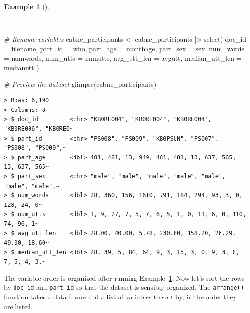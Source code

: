 \documentclass[
  letterpaper,
  DIV=11,
  numbers=noendperiod]{scrreprt}
\newenvironment{Shaded}{\begin{snugshade}}{\end{snugshade}}
\newcommand{\AttributeTok}[1]{\textcolor[rgb]{0.00,0.00,0.00}{#1}}
\newcommand{\CommentTok}[1]{\textcolor[rgb]{0.00,0.00,0.00}{\textit{#1}}}
\newcommand{\FunctionTok}[1]{\textcolor[rgb]{0.00,0.00,0.00}{#1}}
\newcommand{\NormalTok}[1]{\textcolor[rgb]{0.00,0.00,0.00}{#1}}
\newcommand{\OtherTok}[1]{\textcolor[rgb]{0.00,0.00,0.00}{#1}}
\newcommand{\SpecialCharTok}[1]{\textcolor[rgb]{0.00,0.00,0.00}{#1}}
\theoremstyle{definition}
\newtheorem{example}{Example}[chapter]
\theoremstyle{remark}
\begin{document}
\begin{example}[]\protect\hypertarget{exm-cd-cabnc-rename-vars}{}\label{exm-cd-cabnc-rename-vars}

~

\begin{Shaded}
\begin{Highlighting}[]
\CommentTok{\# Rename variables}
\NormalTok{cabnc\_participants }\OtherTok{\textless{}{-}}
\NormalTok{  cabnc\_participants }\SpecialCharTok{|\textgreater{}}
  \FunctionTok{select}\NormalTok{(}
    \AttributeTok{doc\_id =}\NormalTok{ filename,}
    \AttributeTok{part\_id =}\NormalTok{ who,}
    \AttributeTok{part\_age =}\NormalTok{ monthage,}
    \AttributeTok{part\_sex =}\NormalTok{ sex,}
    \AttributeTok{num\_words =}\NormalTok{ numwords,}
    \AttributeTok{num\_utts =}\NormalTok{ numutts,}
    \AttributeTok{avg\_utt\_len =}\NormalTok{ avgutt,}
    \AttributeTok{median\_utt\_len =}\NormalTok{ medianutt}
\NormalTok{  )}

\CommentTok{\# Preview the dataset}
\FunctionTok{glimpse}\NormalTok{(cabnc\_participants)}
\end{Highlighting}
\end{Shaded}

\begin{verbatim}
> Rows: 6,190
> Columns: 8
> $ doc_id         <chr> "KB0RE004", "KB0RE004", "KB0RE004", "KB0RE006", "KB0RE0~
> $ part_id        <chr> "PS008", "PS009", "KB0PSUN", "PS007", "PS008", "PS009",~
> $ part_age       <dbl> 481, 481, 13, 949, 481, 481, 13, 637, 565, 13, 637, 565~
> $ part_sex       <chr> "male", "male", "male", "male", "male", "male", "male",~
> $ num_words      <dbl> 28, 360, 156, 1610, 791, 184, 294, 93, 3, 0, 128, 24, 0~
> $ num_utts       <dbl> 1, 9, 27, 7, 5, 7, 6, 5, 1, 0, 11, 6, 0, 110, 74, 96, 1~
> $ avg_utt_len    <dbl> 28.00, 40.00, 5.78, 230.00, 158.20, 26.29, 49.00, 18.60~
> $ median_utt_len <dbl> 28, 39, 5, 84, 64, 9, 3, 15, 3, 0, 9, 3, 0, 7, 6, 4, 3,~
\end{verbatim}

\end{example}

The variable order is organized after running
Example~\ref{exm-cd-cabnc-rename-vars}. Now let's sort the rows by
\texttt{doc\_id} and \texttt{part\_id} so that the dataset is sensibly
organized. The \texttt{arrange()} function takes a data frame and a list
of variables to sort by, in the order they are listed.
\end{document}

